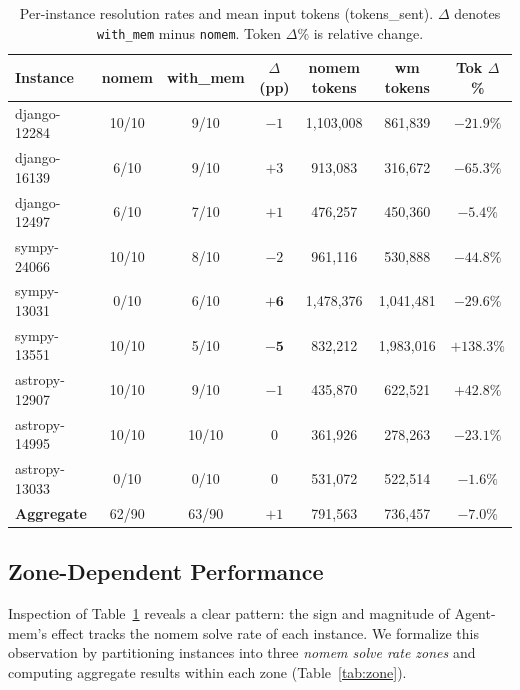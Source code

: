 \documentclass{article}
\begin{document}
\begin{table}[h]
\centering
\caption{Per-instance resolution rates and mean input tokens (tokens\_sent). $\Delta$ denotes \texttt{with\_mem} minus \texttt{nomem}. Token $\Delta\%$ is relative change.}
\label{tab:per_instance}
\setlength{\tabcolsep}{5pt}
\begin{tabular}{lcccccc}
\toprule
\textbf{Instance} & \textbf{nomem} & \textbf{with\_mem} & \textbf{$\Delta$ (pp)} & \textbf{nomem tokens} & \textbf{wm tokens} & \textbf{Tok $\Delta$\%} \\
\midrule
django-12284 & 10/10 & 9/10 & $-1$ & 1,103,008 & 861,839 & $-21.9\%$ \\
django-16139 & 6/10 & 9/10 & $+3$ & 913,083 & 316,672 & $-65.3\%$ \\
django-12497 & 6/10 & 7/10 & $+1$ & 476,257 & 450,360 & $-5.4\%$ \\
sympy-24066 & 10/10 & 8/10 & $-2$ & 961,116 & 530,888 & $-44.8\%$ \\
sympy-13031 & 0/10 & 6/10 & $\mathbf{+6}$ & 1,478,376 & 1,041,481 & $-29.6\%$ \\
sympy-13551 & 10/10 & 5/10 & $\mathbf{-5}$ & 832,212 & 1,983,016 & $+138.3\%$ \\
astropy-12907 & 10/10 & 9/10 & $-1$ & 435,870 & 622,521 & $+42.8\%$ \\
astropy-14995 & 10/10 & 10/10 & $0$ & 361,926 & 278,263 & $-23.1\%$ \\
astropy-13033 & 0/10 & 0/10 & $0$ & 531,072 & 522,514 & $-1.6\%$ \\
\midrule
\textbf{Aggregate} & 62/90 & 63/90 & $+1$ & 791,563 & 736,457 & $-7.0\%$ \\
\bottomrule
\end{tabular}
\end{table}

\subsection{Zone-Dependent Performance}
\label{sec:zone}

Inspection of Table~\ref{tab:per_instance} reveals a clear pattern: the sign and magnitude of Agent-mem's effect tracks the nomem solve rate of each instance. We formalize this observation by partitioning instances into three \emph{nomem solve rate zones} and computing aggregate results within each zone (Table~\ref{tab:zone}).
\end{document}
